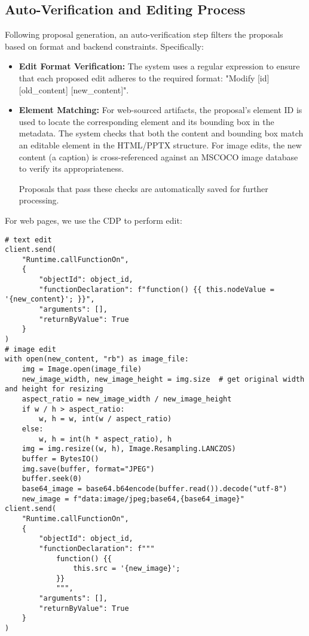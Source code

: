 \subsection{Auto-Verification and Editing Process}
\label{appendix:sec:verifier and editor}

Following proposal generation, an auto-verification step filters the proposals based on format and backend constraints. Specifically:

\begin{itemize}
    \item \textbf{Edit Format Verification:} The system uses a regular expression to ensure that each proposed edit adheres to the required format: "Modify [id] [old\_content] [new\_content]".

    \item \textbf{Element Matching:} For web-sourced artifacts, the proposal’s element ID is used to locate the corresponding element and its bounding box in the metadata. The system checks that both the content and bounding box match an editable element in the HTML/PPTX structure. For image edits, the new content (a caption) is cross-referenced against an MSCOCO image database to verify its appropriateness.

    Proposals that pass these checks are automatically saved for further processing.
    
\end{itemize}

For web pages, we use the CDP to perform edit:

\begin{lstlisting}
# text edit
client.send(
    "Runtime.callFunctionOn",
    {
        "objectId": object_id, 
        "functionDeclaration": f"function() {{ this.nodeValue = '{new_content}'; }}",
        "arguments": [],
        "returnByValue": True
    }
)
# image edit
with open(new_content, "rb") as image_file:
    img = Image.open(image_file)
    new_image_width, new_image_height = img.size  # get original width and height for resizing
    aspect_ratio = new_image_width / new_image_height
    if w / h > aspect_ratio:
        w, h = w, int(w / aspect_ratio)
    else:
        w, h = int(h * aspect_ratio), h
    img = img.resize((w, h), Image.Resampling.LANCZOS)
    buffer = BytesIO()
    img.save(buffer, format="JPEG")
    buffer.seek(0)
    base64_image = base64.b64encode(buffer.read()).decode("utf-8")
    new_image = f"data:image/jpeg;base64,{base64_image}"
client.send(
    "Runtime.callFunctionOn",
    {
        "objectId": object_id,
        "functionDeclaration": f"""
            function() {{
                this.src = '{new_image}';
            }}
            """,
        "arguments": [],
        "returnByValue": True
    }
)
\end{lstlisting}


